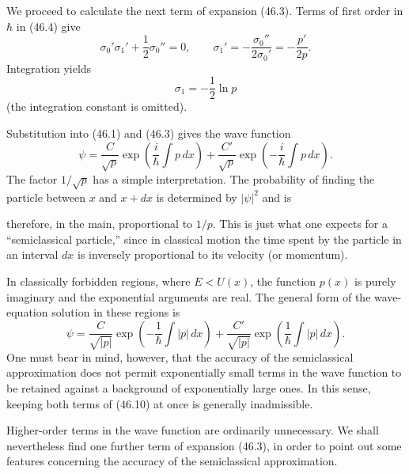 We proceed to calculate the next term of expansion (46.3). Terms of first
order in $\hbar$ in (46.4) give
\[
  \sigma_0'\sigma_1'+\frac12\sigma_0''=0,
  \qquad
  \sigma_1'=-\frac{\sigma_0''}{2\sigma_0'}=-\frac{p'}{2p}.
\]
Integration yields
\begin{equation}
  \sigma_1=-\frac12\ln p
  \tag{46.8}
\end{equation}
(the integration constant is omitted).

Substitution into (46.1) and (46.3) gives the wave function
\begin{equation}
  \psi=\frac C{\sqrt p}\exp\left(\frac i\hbar\int p\,dx\right)
  +\frac{C'}{\sqrt p}\exp\left(-\frac i\hbar\int p\,dx\right).
  \tag{46.9}
\end{equation}
The factor $1/\sqrt p$ has a simple interpretation. The probability of finding
the particle between $x$ and $x+dx$ is determined by $|\psi|^2$ and is

therefore, in the main, proportional to $1/p$. This is just what one expects
for a ``semiclassical particle,'' since in classical motion the time spent by
the particle in an interval $dx$ is inversely proportional to its velocity
(or momentum).

In classically forbidden regions, where $E<U(x)$, the function $p(x)$ is
purely imaginary and the exponential arguments are real. The general form of
the wave-equation solution in these regions is
\begin{equation}
  \psi=\frac C{\sqrt{|p|}}\exp\left(-\frac1\hbar\int|p|\,dx\right)
  +\frac{C'}{\sqrt{|p|}}\exp\left(\frac1\hbar\int|p|\,dx\right).
  \tag{46.10}
\end{equation}
One must bear in mind, however, that the accuracy of the semiclassical
approximation does not permit exponentially small terms in the wave function
to be retained against a background of exponentially large ones. In this
sense, keeping both terms of (46.10) at once is generally inadmissible.

Higher-order terms in the wave function are ordinarily unnecessary. We shall
nevertheless find one further term of expansion (46.3), in order to point out
some features concerning the accuracy of the semiclassical approximation.

